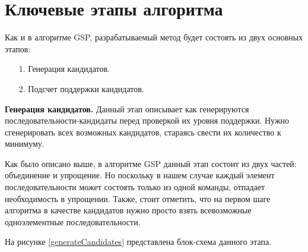 
\section{Ключевые этапы алгоритма}
Как и в алгоритме GSP, разрабатываемый метод будет состоять из двух основных этапов:

\begin{enumerate}
	\item[1.] Генерация кандидатов.
	\item[2.] Подсчет поддержки кандидатов.
\end{enumerate}

\textbf{Генерация кандидатов.}
Данный этап описывает как генерируются последовательности-кандидаты перед проверкой их уровня поддержки. Нужно сгенерировать всех возможных кандидатов, стараясь свести их количество к минимуму.

Как было описано выше, в алгоритме GSP данный этап состоит из двух частей: объединение и упрощение. Но поскольку в нашем случае каждый элемент последовательности может состоять только из одной команды, отпадает необходимость в упрощении. Также, стоит отметить, что на первом шаге алгоритма в качестве кандидатов нужно просто взять всевозможные одноэлементные последовательности.

На рисунке \ref{generateCandidates} представлена блок-схема данного этапа.

